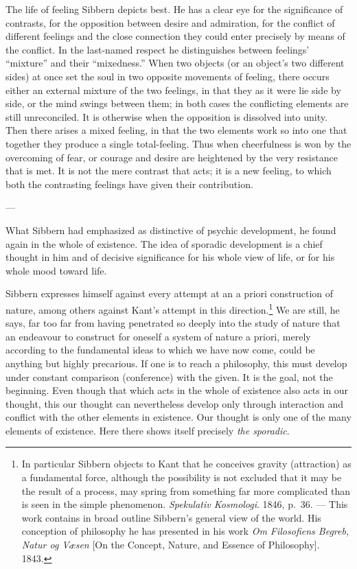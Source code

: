 \documentclass[12pt,a4paper]{book}
\newcommand{\opage}[1]{\marginnote{\footnotesize\textit{[#1]}}}
\begin{document}
The life of feeling Sibbern depicts best. He has a clear eye for the significance of
contrasts, for the opposition between desire and admiration, for the conflict of different
feelings and the close connection they could enter precisely by means of the conflict. In
the last-named respect he distinguishes between feelings' ``mixture'' and their
``mixedness.'' When two objects (or an object's two different sides) at once set the soul
in two opposite movements of feeling, there occurs either an external mixture of the two
feelings, in that they as it were lie side by side, or the mind swings between them; in both
cases the conflicting elements are still unreconciled. It is otherwise when the opposition is
dissolved into unity. Then there arises a mixed feeling, in that the two elements work so
into one that together they produce a single total-feeling. Thus when cheerfulness is won by
the overcoming of fear, or courage and desire are heightened by the very resistance that is
met. It is not the mere contrast that acts; it is a new feeling, to which both the
contrasting feelings have given their contribution.

\begin{center}---\end{center}

What Sibbern had emphasized as distinctive of psychic development, he found again in the
whole of existence. The idea of sporadic development is a chief thought in him and of
decisive significance for his whole view of life, or for his whole mood toward life.

\opage{103}Sibbern expresses himself against every attempt at an a priori construction of nature, among
others against Kant's attempt in this direction.\footnote{In particular Sibbern objects to
Kant that he conceives gravity (attraction) as a fundamental force, although the possibility
is not excluded that it may be the result of a process, may spring from something far more
complicated than is seen in the simple phenomenon. \emph{Spekulativ Kosmologi}. 1846, p.~36.
--- This work contains in broad outline Sibbern's general view of the world. His conception
of philosophy he has presented in his work \emph{Om Filosofiens Begreb, Natur og Væsen} [On
the Concept, Nature, and Essence of Philosophy]. 1843.} We are still, he says, far too far
from having penetrated so deeply into the study of nature that an endeavour to construct for
oneself a system of nature a priori, merely according to the fundamental ideas to which we
have now come, could be anything but highly precarious. If one is to reach a philosophy,
this must develop under constant comparison (conference) with the given. It is the goal, not
the beginning. Even though that which acts in the whole of existence also acts in our
thought, this our thought can nevertheless develop only through interaction and conflict
with the other elements in existence. Our thought is only one of the many elements of
existence. Here there shows itself precisely \emph{the sporadic}.
\end{document}

